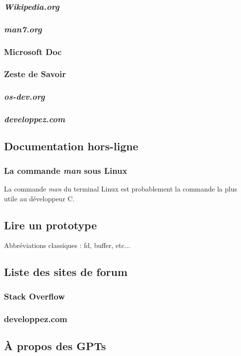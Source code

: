 \documentclass[french]{minitelreport}
\begin{document}
				\subsubsection{\textit{Wikipedia.org}}
				\subsubsection{\textit{man7.org}}
				\subsubsection{Microsoft Doc}
				\subsubsection{Zeste de Savoir}
				\subsubsection{\textit{os-dev.org}}
				\subsubsection{\textit{developpez.com}}
			\subsection{Documentation hors-ligne}
				\subsubsection{La commande \textit{man} sous Linux}
				La commande \textit{man} du terminal Linux est probablement la commande la plus utile au développeur C.
			\subsection{Lire un prototype}
			Abbréviations classiques : fd, buffer, etc...
			\subsection{Liste des sites de forum}
				\subsubsection{Stack Overflow}
				\subsubsection{developpez.com}
			\subsection{À propos des GPTs}
			
\end{document}
